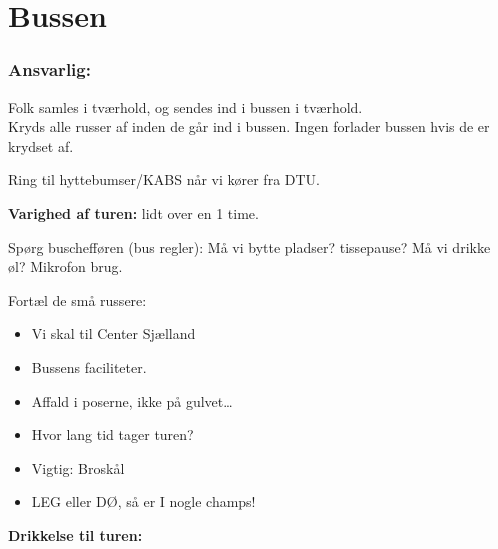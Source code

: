 \section{Bussen}
\subsubsection*{\textbf{Ansvarlig:} \Hemorides}

Folk samles i tværhold, og sendes ind i bussen i tværhold. \\

Kryds alle russer af inden de går ind i bussen.
Ingen forlader bussen hvis de er krydset af.

Ring til hyttebumser/KABS når vi kører fra DTU.

\textbf{Varighed af turen:} lidt over en 1 time.

Spørg buschefføren (bus regler): Må vi bytte pladser? tissepause? Må vi drikke øl? Mikrofon brug.

Fortæl de små russere:
\begin{itemize}
  \item Vi skal til Center Sjælland
  \item Bussens faciliteter.
  \item Affald i poserne, ikke på gulvet\ldots
  \item Hvor lang tid tager turen?
  \item Vigtig: Broskål
  \item LEG eller DØ, så er I nogle champs!
\end{itemize}

\textbf{Drikkelse til turen:}  

